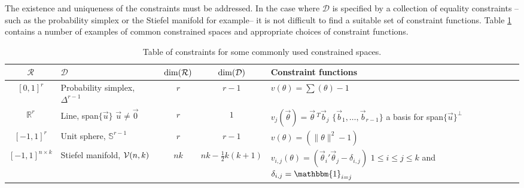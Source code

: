 \documentclass[10pt,fleqn]{article}
\DeclareMathOperator{\1}{\mathbbm{1}} \DeclareMathOperator{\bigO}{\mc O}
\begin{document}
The existence and uniqueness of the constraints must be addressed.  In the
case where $\mathcal{D}$ is specified by a collection of equality
constraints -- such as the probability simplex or the Stiefel manifold for
example--  it is not difficult to find a suitable set of constraint
functions. Table \ref{TABLE:Equality_constraints_examples} contains a
number of examples of common constrained spaces and appropriate choices of
constraint functions.  \renewcommand{\arraystretch}{1.5} \begin{table}[h!]
\begin{center} \begin{tabular}{| c | m{4 cm} | c | c | m{6cm} |}
\hline $\mathcal{R}$                           &
$\mathcal{D}$                                  &
$\dim(\mathcal{R})$                                  &
$\dim( \mathcal{D})$                                 & Constraint functions                                  \\ \hline $[0,1]^r$ &
Probability simplex, $\Delta^{r-1}$            & $r$                            & $r-1$ & $v(\theta)
= \sum(\theta) -1$                                                                                     \\ \hline $\mathbb{R}^r$ & Line,
span$\{\vec{u}\}$ \newline $\vec{u}\ne\vec{0}$ & $r$                            & $1$
&
$v_j(\vec{\theta}) = \vec{\theta}\,^T\vec{b}_j$ \newline
$\{\vec{b}_1,\dots,\vec{b}_{r-1}\}$ a basis for
span$\{\vec{u}\}^\perp$                                                                                \\ \hline $[-1,1]^r$ & Unit
sphere, $\mathbb{S}^{r-1}$                     & $r$                            & $r-1$ & $v(\theta) =
(\|\theta\|^2 -1)$                                                                                     \\ \hline $[-1,1]^{n\times
k}$                                            & Stiefel manifold, $\mathcal{V}(n,k)$ & $nk$  & $nk -
\frac{1}{2}k(k+1)$                             & $v_{i,j}(\theta) = (
\vec{\theta}_i'\vec{\theta}_j- \delta_{i,j})$ \newline
$1\le i \le j \le k$ and $\delta_{i,j} = \mathbbm{1}_{i=j}$
\\ \hline\end{tabular} \end{center} \caption{Table of
constraints for some commonly used constrained spaces.}
\label{TABLE:Equality_constraints_examples} \end{table}
\end{document}
